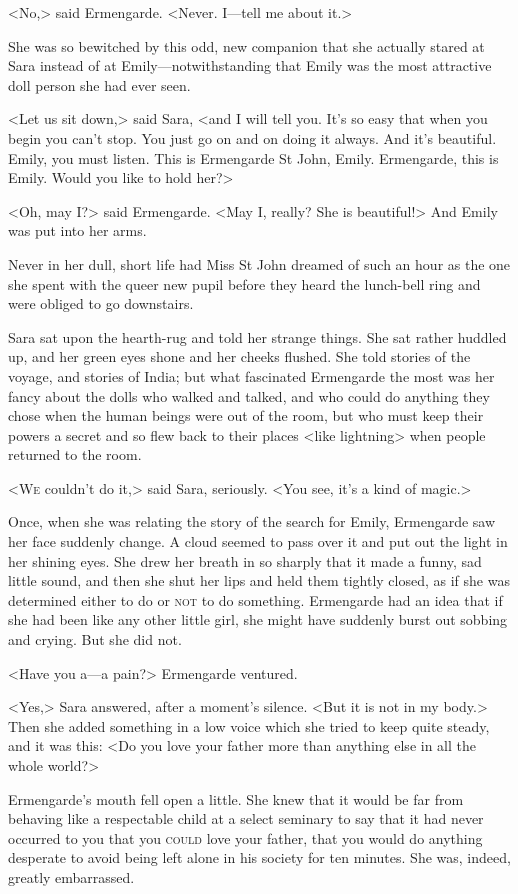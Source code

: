 <No,> said Ermengarde. <Never. I—tell me about it.>

She was so bewitched by this odd, new companion that she actually stared at Sara instead of at Emily—notwithstanding that Emily was the most attractive doll person she had ever seen.

<Let us sit down,> said Sara, <and I will tell you. It's so easy that when you begin you can't stop. You just go on and on doing it always. And it's beautiful. Emily, you must listen. This is Ermengarde St John, Emily. Ermengarde, this is Emily. Would you like to hold her?>

<Oh, may I\@?> said Ermengarde. <May I, really? She is beautiful!> And Emily was put into her arms.

Never in her dull, short life had Miss St John dreamed of such an hour as the one she spent with the queer new pupil before they heard the lunch-bell ring and were obliged to go downstairs.

Sara sat upon the hearth-rug and told her strange things. She sat rather huddled up, and her green eyes shone and her cheeks flushed. She told stories of the voyage, and stories of India; but what fascinated Ermengarde the most was her fancy about the dolls who walked and talked, and who could do anything they chose when the human beings were out of the room, but who must keep their powers a secret and so flew back to their places <like lightning> when people returned to the room.

<\textsc{We} couldn't do it,> said Sara, seriously. <You see, it's a kind of magic.>

Once, when she was relating the story of the search for Emily, Ermengarde saw her face suddenly change. A cloud seemed to pass over it and put out the light in her shining eyes. She drew her breath in so sharply that it made a funny, sad little sound, and then she shut her lips and held them tightly closed, as if she was determined either to do or \textsc{not} to do something. Ermengarde had an idea that if she had been like any other little girl, she might have suddenly burst out sobbing and crying. But she did not.

<Have you a—a pain?> Ermengarde ventured.

<Yes,> Sara answered, after a moment's silence. <But it is not in my body.> Then she added something in a low voice which she tried to keep quite steady, and it was this: <Do you love your father more than anything else in all the whole world?>

Ermengarde's mouth fell open a little. She knew that it would be far from behaving like a respectable child at a select seminary to say that it had never occurred to you that you \textsc{could} love your father, that you would do anything desperate to avoid being left alone in his society for ten minutes. She was, indeed, greatly embarrassed.

